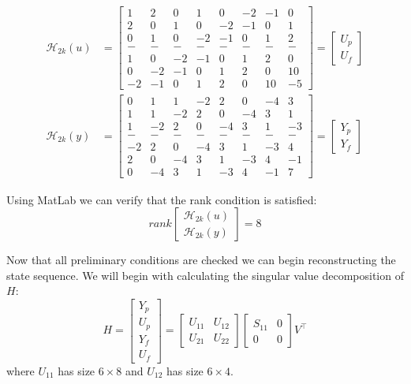 \begin{align*}
	\mathcal{H}_{2k}(u) &= \begin{bmatrix}
		1  &   2  &   0  &   1  &   0  &  -2  &  -1  &   0\\
		2  &   0  &   1  &   0  &  -2  &  -1  &   0  &   1\\
		0  &   1  &   0  &  -2  &  -1  &   0  &   1  &   2\\ 
		- & - & - & - & - & - & - & -\\
		1  &   0  &  -2  &  -1  &   0  &   1  &   2  &   0\\
		0  &  -2  &  -1  &   0  &   1  &   2  &   0  &  10\\
		-2 &  -1  &   0  &   1  &   2  &   0  &  10  &  -5
	\end{bmatrix} = \begin{bmatrix} U_p \\ U_f \end{bmatrix} \\
	\mathcal{H}_{2k}(y) &= \begin{bmatrix}
		0  &   1  &   1  &  -2  &   2  &   0  &  -4  &   3\\
		1  &   1  &  -2  &   2  &   0  &  -4  &   3  &   1\\
		1  &  -2  &   2  &   0  &  -4  &   3  &   1  &  -3\\ 
		- & - & - & - & - & - & - & -\\
		-2 &   2  &   0  &  -4  &   3  &   1  &  -3  &   4\\
		2  &   0  &  -4  &   3  &   1  &  -3  &   4  &  -1\\
		0  &  -4  &   3  &   1  &  -3  &   4  &  -1  &   7
	\end{bmatrix} = \begin{bmatrix} Y_p \\ Y_f \end{bmatrix}
\end{align*}

Using MatLab we can verify that the rank condition is satisfied:
\[ rank\begin{bmatrix} \mathcal{H}_{2k}(u) \\ \mathcal{H}_{2k}(y) \end{bmatrix} = 8 \]

Now that all preliminary conditions are checked we can begin reconstructing the state sequence. We will begin with calculating the singular value decomposition of $H$:
\begin{equation*}
	H = \begin{bmatrix} Y_p\\U_p\\Y_f\\U_f \end{bmatrix} = \begin{bmatrix} U_{11} & U_{12} \\ U_{21} & U_{22} \end{bmatrix} \begin{bmatrix} S_{11} & 0 \\ 0 & 0 \end{bmatrix} V^\top 
\end{equation*}
where $U_{11}$ has size $6 \times 8$ and $U_{12}$ has size $6 \times 4$.

